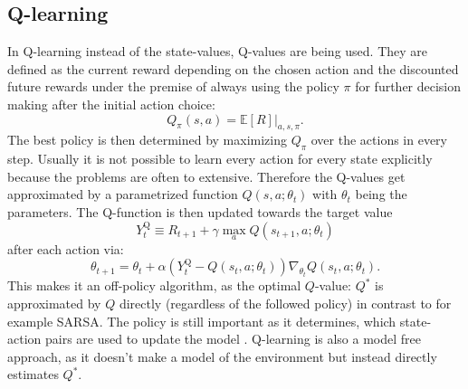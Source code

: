 \subsection{Q-learning\anna}
In Q-learning \cite{DBLP:journals/corr/HasseltGS15} instead of the state-values, Q-values are being used. They are defined as the current reward depending on the chosen action and the discounted future rewards under the premise of always using the policy $\pi$ for further decision making after the initial action choice:
\begin{equation}
Q_\pi(s,a)=\mathbb{E}\left[R\right]|_{a,s,\pi}.
\end{equation} 
The best policy is then determined by maximizing $Q_\pi$ over the actions in every step.
Usually it is not possible to learn every action for every state explicitly because the problems are often to extensive. Therefore the Q-values get approximated by a parametrized function $Q(s,a;\theta_t)$ with $\theta_t$ being the parameters. The Q-function is then updated towards the target value
\begin{equation}\label{eq:Q-target}Y_{t}^{\mathrm{Q}} \equiv R_{t+1}+\gamma \max _{a} Q\left(s_{t+1}, a ; \theta_{t}\right)
\end{equation}
after each action via:
\begin{equation}
\theta_{t+1}=\theta_{t}+\alpha\left(Y_{t}^{\mathrm{Q}}-Q\left(s_{t}, a; \theta_{t}\right)\right) \nabla_{\theta_{t}} Q\left(s_{t}, a ; \theta_{t}\right).
\end{equation}
This makes it an off-policy algorithm, as the optimal $Q$-value: $Q^*$ is approximated by $Q$ directly (regardless of the followed policy) in contrast to for example SARSA. The policy is still important as it determines, which state-action pairs are used to update the model \cite{Sutton:1998:IRL:551283}. 
Q-learning is also a model free approach, as it doesn't make a model of the environment but instead directly estimates $Q^*$.\\
